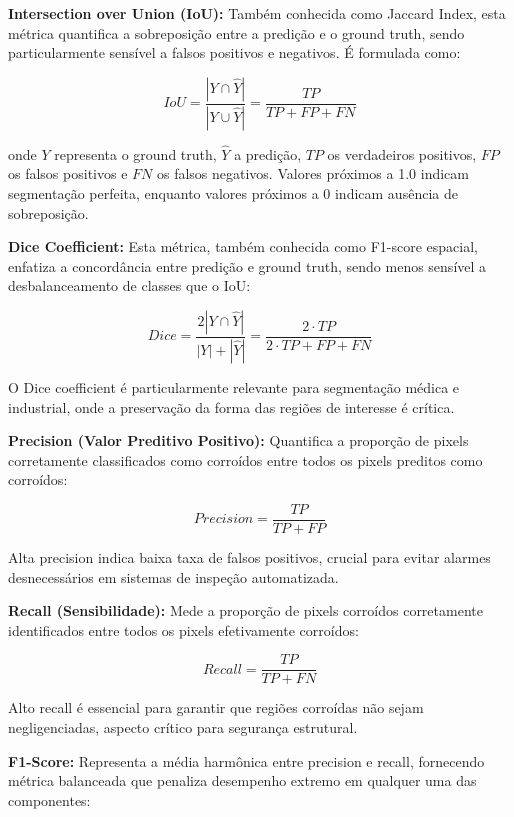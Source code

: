 \documentclass[12pt,a4paper,twoside]{article}
\begin{document}
\textbf{Intersection over Union (IoU):} Também conhecida como Jaccard Index, esta métrica quantifica a sobreposição entre a predição e o ground truth, sendo particularmente sensível a falsos positivos e negativos. É formulada como:

\begin{equation}
IoU = \frac{|Y \cap \hat{Y}|}{|Y \cup \hat{Y}|} = \frac{TP}{TP + FP + FN}
\end{equation}

onde $Y$ representa o ground truth, $\hat{Y}$ a predição, $TP$ os verdadeiros positivos, $FP$ os falsos positivos e $FN$ os falsos negativos. Valores próximos a 1.0 indicam segmentação perfeita, enquanto valores próximos a 0 indicam ausência de sobreposição.

\textbf{Dice Coefficient:} Esta métrica, também conhecida como F1-score espacial, enfatiza a concordância entre predição e ground truth, sendo menos sensível a desbalanceamento de classes que o IoU:

\begin{equation}
Dice = \frac{2|Y \cap \hat{Y}|}{|Y| + |\hat{Y}|} = \frac{2 \cdot TP}{2 \cdot TP + FP + FN}
\end{equation}

O Dice coefficient é particularmente relevante para segmentação médica e industrial, onde a preservação da forma das regiões de interesse é crítica.

\textbf{Precision (Valor Preditivo Positivo):} Quantifica a proporção de pixels corretamente classificados como corroídos entre todos os pixels preditos como corroídos:

\begin{equation}
Precision = \frac{TP}{TP + FP}
\end{equation}

Alta precision indica baixa taxa de falsos positivos, crucial para evitar alarmes desnecessários em sistemas de inspeção automatizada.

\textbf{Recall (Sensibilidade):} Mede a proporção de pixels corroídos corretamente identificados entre todos os pixels efetivamente corroídos:

\begin{equation}
Recall = \frac{TP}{TP + FN}
\end{equation}

Alto recall é essencial para garantir que regiões corroídas não sejam negligenciadas, aspecto crítico para segurança estrutural.

\textbf{F1-Score:} Representa a média harmônica entre precision e recall, fornecendo métrica balanceada que penaliza desempenho extremo em qualquer uma das componentes:
\end{document}

